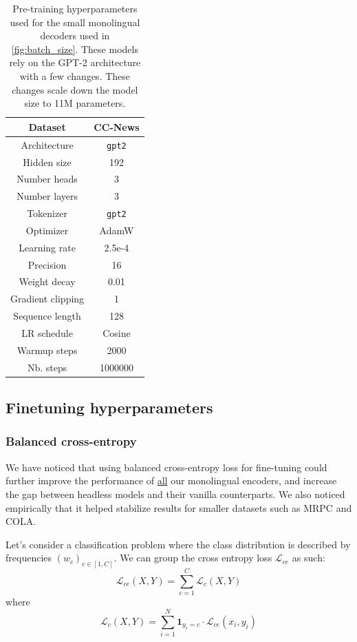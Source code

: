 \begin{table}[H]
\centering
\small
\begin{tabular}{c|c}
\toprule
Dataset & CC-News \\ \hline
Architecture & \texttt{gpt2} \\ \hline
Hidden size & 192 \\ \hline
Number heads & 3 \\ \hline
Number layers & 3 \\ \hline
Tokenizer & \texttt{gpt2} \\ \hline
Optimizer         & AdamW      \\ \hline
Learning rate     & 2.5e-4       \\ \hline
Precision  & 16 \\ \hline
Weight decay      & 0.01       \\ \hline
Gradient clipping & 1          \\ \hline
Sequence length   & 128        \\ \hline
LR schedule       & Cosine \\ \hline
Warmup steps      & 2000      \\ \hline
Nb. steps         & 1000000        \\ \bottomrule
\end{tabular}
\caption{Pre-training hyperparameters used for the small monolingual decoders used in \autoref{fig:batch_size}. These models rely on the GPT-2 architecture with a few changes. These changes scale down the model size to 11M parameters.}
\end{table}

\subsection{Finetuning hyperparameters}
\label{app:ft}

\subsubsection{Balanced cross-entropy}
\label{app:bce}
We have noticed that using balanced cross-entropy loss for fine-tuning could further improve the performance of \underline{all} our monolingual encoders, and increase the gap between headless models and their vanilla counterparts. We also noticed empirically that it helped stabilize results for smaller datasets such as MRPC and COLA.

Let's consider a classification problem where the class distribution is described by frequencies $(w_c)_{c \in [1, C]}$. We can group the cross entropy loss $\mathcal{L}_{ce}$ as such:
$$
\mathcal{L}_{ce}(X, Y) = \sum_{c=1}^{C} \mathcal{L}_c(X, Y)
$$
where 
$$
\mathcal{L}_c(X, Y) = \sum_{i=1}^{N} \mathbf{1}_{y_i = c} \cdot \mathcal{L}_{ce}(x_i, y_i)
$$

